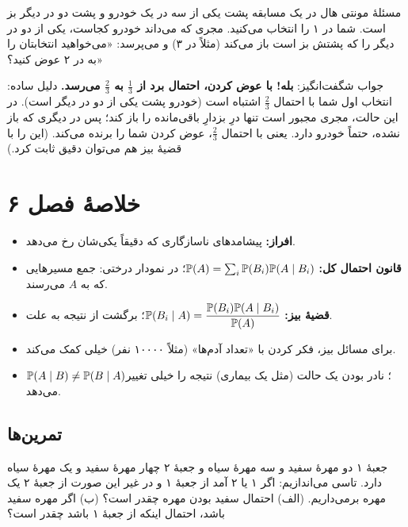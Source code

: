 \begin{moreinfo}{مسئلهٔ مونتی هال}
در یک مسابقه پشت یکی از سه در یک خودرو و پشت دو در دیگر بز است. شما در ۱ را انتخاب می‌کنید. مجری که می‌داند خودرو کجاست، یکی از دو در دیگر را که پشتش بز است باز می‌کند (مثلاً در ۳) و می‌پرسد: «می‌خواهید انتخابتان را به در ۲ عوض کنید؟»

جواب شگفت‌انگیز: \textbf{بله! با عوض کردن، احتمال برد از $\tfrac13$ به $\tfrac23$ می‌رسد.} دلیل ساده: انتخاب اول شما با احتمال $\tfrac23$ اشتباه است (خودرو پشت یکی از دو در دیگر است). در این حالت، مجری مجبور است تنها درِ بزدارِ باقی‌مانده را باز کند؛ پس در دیگری که باز نشده، حتماً خودرو دارد. یعنی با احتمال $\tfrac23$، عوض کردن شما را برنده می‌کند. (این را با قضیهٔ بیز هم می‌توان دقیق ثابت کرد.)
\end{moreinfo}

\section*{خلاصهٔ فصل ۶}

\begin{summary}[title={\leavevmode\boxicon{accent}{$\Sigma$}\ \ خلاصهٔ فصل}]
\begin{itemize}
  \item \textbf{افراز:} پیشامدهای ناسازگاری که دقیقاً یکی‌شان رخ می‌دهد.
  \item \textbf{قانون احتمال کل:} $\P(A)=\sum_i\P(B_i)\P(A\mid B_i)$؛ در نمودار درختی: جمع مسیرهایی که به $A$ می‌رسند.
  \item \textbf{قضیهٔ بیز:} $\P(B_i\mid A)=\dfrac{\P(B_i)\P(A\mid B_i)}{\P(A)}$؛ برگشت از نتیجه به علت.
  \item برای مسائل بیز، فکر کردن با «تعداد آدم‌ها» (مثلاً ۱۰۰۰۰ نفر) خیلی کمک می‌کند.
  \item $\P(A\mid B)\ne\P(B\mid A)$؛ نادر بودن یک حالت (مثل یک بیماری) نتیجه را خیلی تغییر می‌دهد.
\end{itemize}
\end{summary}

\subsection*{تمرین‌ها}

\begin{exercise}
جعبهٔ ۱ دو مهرهٔ سفید و سه مهرهٔ سیاه و جعبهٔ ۲ چهار مهرهٔ سفید و یک مهرهٔ سیاه دارد. تاسی می‌اندازیم: اگر ۱ یا ۲ آمد از جعبهٔ ۱ و در غیر این صورت از جعبهٔ ۲ یک مهره برمی‌داریم. (الف) احتمال سفید بودن مهره چقدر است؟ (ب) اگر مهره سفید باشد، احتمال اینکه از جعبهٔ ۱ باشد چقدر است؟
\end{exercise}

